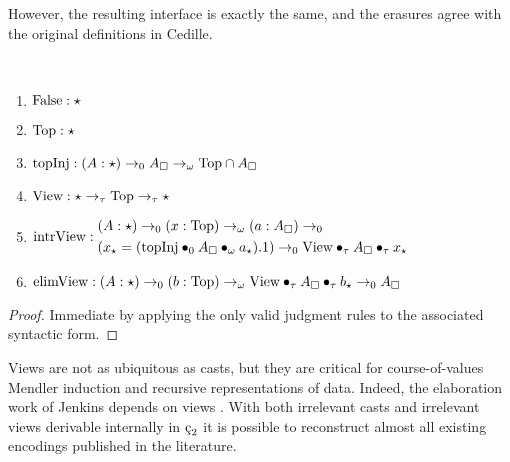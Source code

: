 However, the resulting interface is exactly the same, and the erasures agree with the original definitions in Cedille.
\begin{theorem}
    \label{lem:2:view_derivations}
    \textcolor{white}{\_}
    \begin{enumerate}
        \item $\textnormal{False} : \star$
        \item $\textnormal{Top} : \star$
        \item $\textnormal{topInj} : (A:\star) \to_0 A_\square \to_\omega \textnormal{Top} \cap A_\square$
        \item $\textnormal{View} : \star \to_\tau \textnormal{Top} \to_\tau \star$
        \item {
            $
                \textnormal{intrView} : 
                \begin{aligned}
                    &(A:\star) \to_0 (x:\textnormal{Top}) \to_\omega (a:A_\square) \to_0
                        \\ &(x_\star = (\textnormal{topInj} \bullet_{0} A_\square \bullet_{\omega} a_\star).1) \to_0 \textnormal{View} \bullet_{\tau} A_\square \bullet_{\tau} x_\star
                \end{aligned}
            $
        }
        \item $\textnormal{elimView} : (A:\star) \to_0 (b:\textnormal{Top}) \to_\omega \textnormal{View} \bullet_{\tau} A_\square \bullet_{\tau} b_\star \to_0 A_\square$
    \end{enumerate}
\end{theorem}
\begin{proof}
    Immediate by applying the only valid judgment rules to the associated syntactic form.
\end{proof}
Views are not as ubiquitous as casts, but they are critical for course-of-values Mendler induction and recursive representations of data.
Indeed, the elaboration work of Jenkins depends on views \cite{jenkins2023elaborating}.
With both irrelevant casts and irrelevant views derivable internally in $\ced$ it is possible to reconstruct almost all existing encodings published in the literature.
